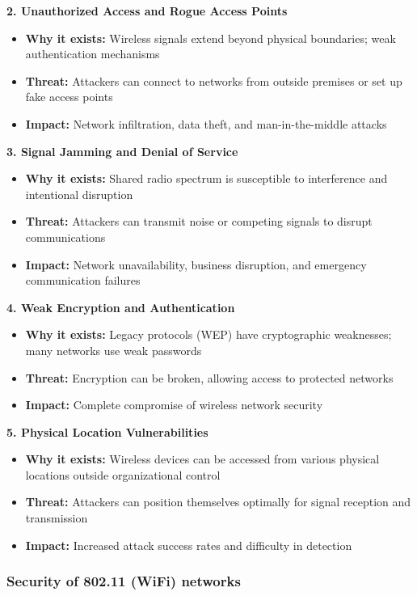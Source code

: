 \documentclass[12pt,a4paper]{article}
\begin{document}
\textbf{2. Unauthorized Access and Rogue Access Points}
\begin{itemize}
    \item \textbf{Why it exists:} Wireless signals extend beyond physical boundaries; weak authentication mechanisms
    \item \textbf{Threat:} Attackers can connect to networks from outside premises or set up fake access points
    \item \textbf{Impact:} Network infiltration, data theft, and man-in-the-middle attacks
\end{itemize}

\textbf{3. Signal Jamming and Denial of Service}
\begin{itemize}
    \item \textbf{Why it exists:} Shared radio spectrum is susceptible to interference and intentional disruption
    \item \textbf{Threat:} Attackers can transmit noise or competing signals to disrupt communications
    \item \textbf{Impact:} Network unavailability, business disruption, and emergency communication failures
\end{itemize}

\textbf{4. Weak Encryption and Authentication}
\begin{itemize}
    \item \textbf{Why it exists:} Legacy protocols (WEP) have cryptographic weaknesses; many networks use weak passwords
    \item \textbf{Threat:} Encryption can be broken, allowing access to protected networks
    \item \textbf{Impact:} Complete compromise of wireless network security
\end{itemize}

\textbf{5. Physical Location Vulnerabilities}
\begin{itemize}
    \item \textbf{Why it exists:} Wireless devices can be accessed from various physical locations outside organizational control
    \item \textbf{Threat:} Attackers can position themselves optimally for signal reception and transmission
    \item \textbf{Impact:} Increased attack success rates and difficulty in detection
\end{itemize}

\subsubsection{Security of 802.11 (WiFi) networks}
\end{document}
